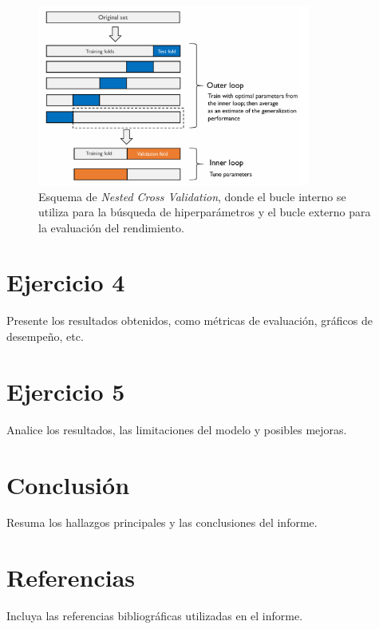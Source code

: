 \documentclass[12pt,a4paper]{article}
\begin{document}
\begin{figure}[H]
    \centering
    \includegraphics[width=0.8\textwidth]{Imagenes/nested-kfold-cv.png}
    \caption{Esquema de \textit{Nested Cross Validation}, donde el bucle interno se utiliza para la búsqueda de hiperparámetros y el bucle externo para la evaluación del rendimiento.}
    \label{fig:nested_cross_validation}
\end{figure}
 \section{Ejercicio 4}
Presente los resultados obtenidos, como métricas de evaluación, gráficos de desempeño, etc.

\section{Ejercicio 5}
Analice los resultados, las limitaciones del modelo y posibles mejoras.

\section{Conclusión}
Resuma los hallazgos principales y las conclusiones del informe.

\section*{Referencias}
Incluya las referencias bibliográficas utilizadas en el informe.
\end{document}
